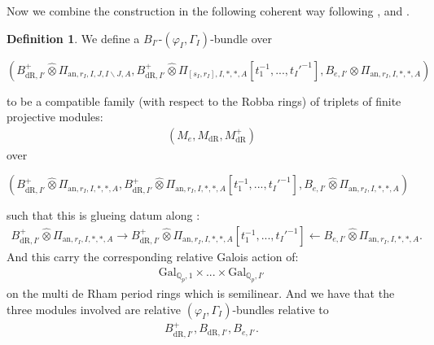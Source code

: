 \documentclass[12pt]{amsart}
\newtheorem{proposition}[theorem]{Proposition}
\theoremstyle{definition}
\newtheorem{definition}[theorem]{Definition}
\numberwithin{equation}{section}
\begin{document}
%
%
%
%	
%


\indent Now we combine the construction in the following coherent way following \cite[Section 2]{Ber1}, \cite[Definition 2.2]{Nak1} and \cite[Definition 2.2.6]{KPX}.

\begin{definition}
We define a $B_{I'}$-$(\varphi_I,\Gamma_I)$-bundle over
\begin{center}
$(B^+_{\mathrm{dR},I'}	\widehat{\otimes}\Pi_{\mathrm{an},r_{I},I,J,I\backslash J,A},B^+_{\mathrm{dR},I'}	\widehat{\otimes}\Pi_{[s_I,r_I],I,*,*,A}[t_1^{-1},...,t_I'^{-1}],B_{e,I'}	\widehat{\otimes}\Pi_{\mathrm{an},r_{I},I,*,*,A})$	
\end{center}
to be a compatible family (with respect to the Robba rings) of triplets of finite projective modules:
\begin{align}
(M_e,M_{\mathrm{dR}},M^+_{\mathrm{dR}})	
\end{align}
over 
\begin{center}
$(B^+_{\mathrm{dR},I'}	\widehat{\otimes}\Pi_{\mathrm{an},r_{I},I,*,*,A},B^+_{\mathrm{dR},I'}	\widehat{\otimes}\Pi_{\mathrm{an},r_{I},I,*,*,A}[t_1^{-1},...,t_I'^{-1}],B_{e,I'}	\widehat{\otimes}\Pi_{\mathrm{an},r_{I},I,*,*,A})$	
\end{center}
such that this is glueing datum along :
\begin{align}
B^+_{\mathrm{dR},I'}	\widehat{\otimes}\Pi_{\mathrm{an},r_{I},I,*,*,A}\rightarrow B^+_{\mathrm{dR},I'}	\widehat{\otimes}\Pi_{\mathrm{an},r_{I},I,*,*,A}[t_1^{-1},...,t_I'^{-1}] \leftarrow B_{e,I'}	\widehat{\otimes}\Pi_{\mathrm{an},r_{I},I,*,*,A}.	
\end{align}
And this carry the corresponding relative Galois action of:
\begin{align}
\mathrm{Gal}_{\mathbb{Q}_p,1}\times...\times \mathrm{Gal}_{\mathbb{Q}_p,I'}		
\end{align}
on the multi de Rham period rings which is semilinear. And we have that the three modules involved are relative $(\varphi_I,\Gamma_I)$-bundles relative to
\begin{align}
B^+_{\mathrm{dR},I'},B_{\mathrm{dR},I'},B_{e,I'}.	
\end{align}

	
\end{definition}
\end{document}
